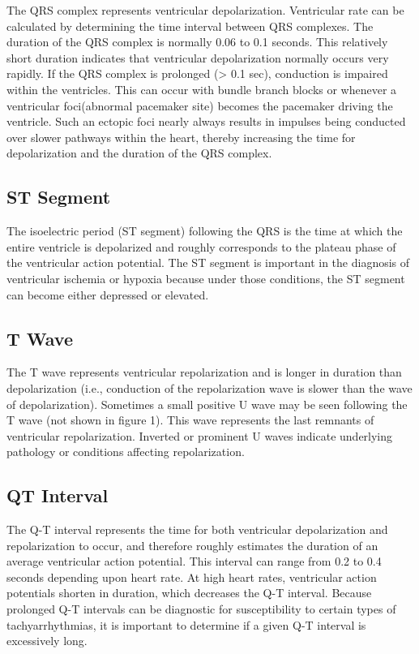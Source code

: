 \documentclass[
  11pt,
  letterpaper,
  DIV=11,
  numbers=noendperiod]{scrreprt}
\begin{document}
The QRS complex represents ventricular depolarization. Ventricular rate
can be calculated by determining the time interval between QRS
complexes. The duration of the QRS complex is normally 0.06 to 0.1
seconds. This relatively short duration indicates that ventricular
depolarization normally occurs very rapidly. If the QRS complex is
prolonged (\textgreater{} 0.1 sec), conduction is impaired within the
ventricles. This can occur with bundle branch blocks or whenever a
ventricular foci(abnormal pacemaker site) becomes the pacemaker driving
the ventricle. Such an ectopic foci nearly always results in impulses
being conducted over slower pathways within the heart, thereby
increasing the time for depolarization and the duration of the QRS
complex.

\subsection{ST Segment}\label{st-segment}

The isoelectric period (ST segment) following the QRS is the time at
which the entire ventricle is depolarized and roughly corresponds to the
plateau phase of the ventricular action potential. The ST segment is
important in the diagnosis of ventricular ischemia or hypoxia because
under those conditions, the ST segment can become either depressed or
elevated.

\subsection{T Wave}\label{t-wave}

The T wave represents ventricular repolarization and is longer in
duration than depolarization (i.e., conduction of the repolarization
wave is slower than the wave of depolarization). Sometimes a small
positive U wave may be seen following the T wave (not shown in figure
1). This wave represents the last remnants of ventricular
repolarization. Inverted or prominent U waves indicate underlying
pathology or conditions affecting repolarization.

\subsection{QT Interval}\label{qt-interval}

The Q-T interval represents the time for both ventricular depolarization
and repolarization to occur, and therefore roughly estimates the
duration of an average ventricular action potential. This interval can
range from 0.2 to 0.4 seconds depending upon heart rate. At high heart
rates, ventricular action potentials shorten in duration, which
decreases the Q-T interval. Because prolonged Q-T intervals can be
diagnostic for susceptibility to certain types of tachyarrhythmias, it
is important to determine if a given Q-T interval is excessively long.
\end{document}

